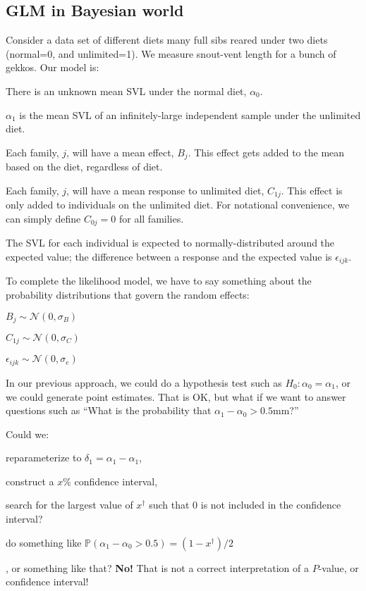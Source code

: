 \documentclass[11pt]{article}
\renewcommand{\Pr}{{\mathbb P}}
\begin{document}
\subsection*{GLM in Bayesian world}
Consider a data set of different diets many full sibs reared under two diets (normal=0, and unlimited=1).
We measure snout-vent length for a bunch of gekkos.
Our model is:
\begin{compactitem}
	\item There is an unknown mean SVL under the normal diet, $\alpha_0$.
	\item $\alpha_1$ is the mean SVL of an infinitely-large independent sample under the unlimited diet.
	\item Each family, $j$, will have a mean effect, $B_j$. This effect gets added to the mean based on the diet, regardless of diet.
	\item Each family, $j$, will have a mean response to unlimited diet, $C_{1j}$. This effect is only added to individuals on the unlimited diet. For notational convenience, we can simply define $C_{0j}=0$ for all families.
	\item The SVL for each individual is expected to normally-distributed around the expected value; the difference between a response and the expected value is $\epsilon_{ijk}$.
\end{compactitem}
To complete the likelihood model, we have to say something about the probability distributions that govern the random effects:
\begin{compactitem}
	\item $B_j \sim \mathcal{N}(0, \sigma_B)$
	\item $C_{1j} \sim \mathcal{N}(0, \sigma_C)$
	\item $\epsilon_{ijk} \sim \mathcal{N}(0, \sigma_e)$
\end{compactitem}

In our previous approach, we could do a hypothesis test such as $H_0: \alpha_0 = \alpha_1$, or we could generate point estimates.
That is OK, but what if we want to answer questions such as ``What is the probability that $\alpha_1 - \alpha_0 > 0.5$mm?''

Could we:
\begin{compactitem}
	\item reparameterize to $\delta_1 = \alpha_1 - \alpha_1$,
	\item construct a $x\%$ confidence interval,
	\item search for the largest value of $x^{\dag}$ such that 0 is not included in the confidence interval?
	\item do something like $\Pr(\alpha_1 - \alpha_0 > 0.5) = (1-x^{\dag})/2$
\end{compactitem}
, or something like that? {\bf No!} That is not a correct interpretation of a $P$-value, or confidence interval!
\end{document}
